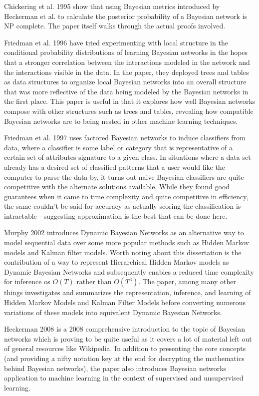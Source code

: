 \documentclass{article}
\begin{document}
Chickering et al. 1995\cite{Chickering95} show that using Bayesian metrics introduced by Heckerman et al. to calculate the posterior probability of a Bayesian network is NP complete. The paper itself walks through the actual proofs involved.

Friedman et al. 1996\cite{FriedmanG96} have tried experimenting with local structure in the conditional probability distributions of learning Bayesian networks in the hopes that a stronger correlation between the interactions modeled in the network and the interactions visible in the data. In the paper, they deployed trees and tables as data structures to organize local Bayesian networks into an overall structure that was more reflective of the data being modeled by the Bayesian networks in the first place. This
paper is useful in that it explores how well Bayesian networks compose with other structures such as trees and tables, revealing how compatible Bayesian networks are to being nested in other machine learning techniques.

Friedman et al. 1997\cite{FriedmanGG97} uses factored Bayesian networks to induce classifiers from data, where a classifier is some label or category that is representative of a certain set of attributes signature to a given class. In situations where a data set already has a desired set of classified patterns that a user would like the computer to parse the data by, it turns out naive Bayesian classifiers are quite competitive with the alternate solutions available. While they found good
guarantees when it came to time complexity and quite competitive in efficiency, the same couldn't be said for accuracy as actually scoring the classification is intractable - suggesting approximation is the best that can be done here.

Murphy 2002\cite{murphy02} introduces Dynamic Bayesian Networks as an alternative way to model sequential data over some more popular methods such as Hidden Markov models and Kalman filter models. Worth noting about this dissertation is the contribution of a way to represent Hierarchical Hidden Markov models as Dynamic Bayesian Networks and subsequently enables a reduced time complexity for inference os $O(T)$ rather than $O(T^3)$. The paper, among many other things investigates and summarizes the
representation, inference, and learning of Hidden Markov Models and Kalman Filter Models before converting numerous variations of these models into equivalent Dynamic Bayesian Networks.

Heckerman 2008\cite{Heckerman08} is a 2008 comprehensive introduction to the topic of Bayesian networks which is proving to be quite useful as it covers a lot of material left out of general resources like Wikipedia. In addition to presenting the core concepts (and providing a nifty notation key at the end for decrypting the mathematics behind Bayesian networks), the paper also introduces Bayesian networks application to machine learning in the context of supervised and unsupervised learning.



\end{document}
